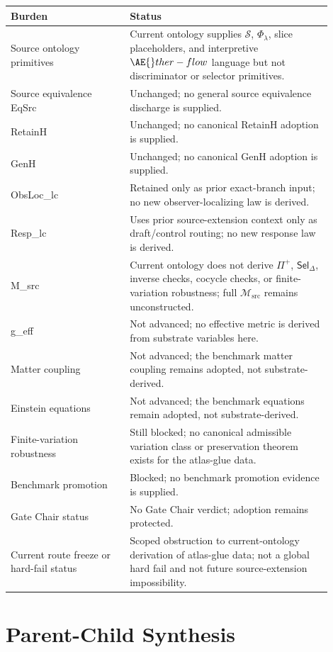 \documentclass[11pt]{article}
\newcommand{\Aflow}{\AE{}ther-flow}
\newcommand{\Sub}{\mathcal{S}}
\newcommand{\Msrc}{\mathcal{M}_{\mathrm{src}}}
\newcommand{\Prof}{\Pi^{+}}
\newcommand{\Sel}{\mathsf{Sel}_{\Delta}}
\begin{document}
\begin{center}
\begin{tabular}{p{0.33\linewidth}p{0.57\linewidth}}
\hline
Burden & Status \\
\hline
Source ontology primitives & Current ontology supplies \(\Sub\), \(\Phi_\lambda\), slice placeholders, and interpretive \(\Aflow\) language but not discriminator or selector primitives. \\
Source equivalence EqSrc & Unchanged; no general source equivalence discharge is supplied. \\
RetainH & Unchanged; no canonical RetainH adoption is supplied. \\
GenH & Unchanged; no canonical GenH adoption is supplied. \\
ObsLoc\_lc & Retained only as prior exact-branch input; no new observer-localizing law is derived. \\
Resp\_lc & Uses prior source-extension context only as draft/control routing; no new response law is derived. \\
M\_src & Current ontology does not derive \(\Prof\), \(\Sel\), inverse checks, cocycle checks, or finite-variation robustness; full \(\Msrc\) remains unconstructed. \\
g\_eff & Not advanced; no effective metric is derived from substrate variables here. \\
Matter coupling & Not advanced; the benchmark matter coupling remains adopted, not substrate-derived. \\
Einstein equations & Not advanced; the benchmark equations remain adopted, not substrate-derived. \\
Finite-variation robustness & Still blocked; no canonical admissible variation class or preservation theorem exists for the atlas-glue data. \\
Benchmark promotion & Blocked; no benchmark promotion evidence is supplied. \\
Gate Chair status & No Gate Chair verdict; adoption remains protected. \\
Current route freeze or hard-fail status & Scoped obstruction to current-ontology derivation of atlas-glue data; not a global hard fail and not future source-extension impossibility. \\
\hline
\end{tabular}
\end{center}

\section{Parent-Child Synthesis}
\end{document}
